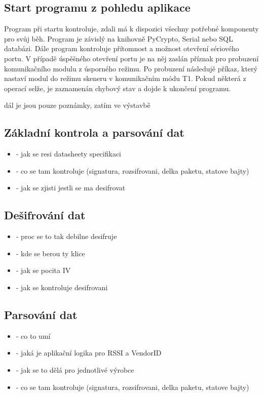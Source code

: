\subsection{Start programu z pohledu aplikace}
Program při startu kontroluje, zdali  má k dispozici všechny potřebné komponenty pro svůj běh. Program je závislý na knihovně PyCrypto, Serial nebo SQL databázi.
Dále program kontroluje přítomnost a možnost otevření sériového portu. V případě úspěšného otevření portu je na něj zaslán příznak pro probuzení komunikačního modulu z úsporného režimu. Po probuzení následujě příkaz, který nastaví modul do režimu skeneru v komunikačním módu T1. Pokud některá z operací selže, je zaznamenán chybový stav a dojde k ukončení programu.

\colorbox[rgb]{0,1,0}{dál je jsou pouze poznámky, zatím ve výstavbě}

\subsection{Základní kontrola a parsování dat}
\begin{itemize}
\item - jak se resi datasheety specifikaci
\item - co se tam kontroluje (signatura, rozsifrovani, delka paketu, statove bajty)
\item - jak se zjisti jestli se ma desifrovat
\end{itemize}

\subsection{Dešifrování dat}
\begin{itemize}
\item - proc se to tak debilne desifruje
\item - kde se berou ty klice
\item - jak se pocita IV
\item - jak se kontroluje desifrovani
\end{itemize}

\subsection{Parsování dat}
\begin{itemize}
\item - co to umí
\item - jaká je aplikační logika pro RSSI a VendorID
\item - jak se to dělá pro jednotlivé výrobce
\item - co se tam kontroluje (signatura, rozsifrovani, delka paketu, statove bajty)
\end{itemize}

